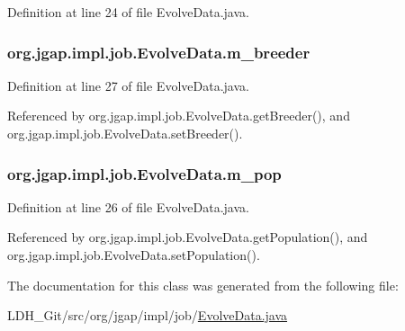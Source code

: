 Definition at line 24 of file Evolve\-Data.\-java.

\hypertarget{classorg_1_1jgap_1_1impl_1_1job_1_1_evolve_data_ac8aa8a8aae7d28f929d42715f6282bcf}{
\subsubsection[{m\-\_\-breeder}]{ org.\-jgap.\-impl.\-job.\-Evolve\-Data.\-m\-\_\-breeder\hspace{0.3cm}{\ttfamily [private]}}}\label{classorg_1_1jgap_1_1impl_1_1job_1_1_evolve_data_ac8aa8a8aae7d28f929d42715f6282bcf}


Definition at line 27 of file Evolve\-Data.\-java.



Referenced by org.\-jgap.\-impl.\-job.\-Evolve\-Data.\-get\-Breeder(), and org.\-jgap.\-impl.\-job.\-Evolve\-Data.\-set\-Breeder().

\hypertarget{classorg_1_1jgap_1_1impl_1_1job_1_1_evolve_data_a99e01adda240e2093606485be749c4f2}{
\subsubsection[{m\-\_\-pop}]{ org.\-jgap.\-impl.\-job.\-Evolve\-Data.\-m\-\_\-pop\hspace{0.3cm}{\ttfamily [private]}}}\label{classorg_1_1jgap_1_1impl_1_1job_1_1_evolve_data_a99e01adda240e2093606485be749c4f2}


Definition at line 26 of file Evolve\-Data.\-java.



Referenced by org.\-jgap.\-impl.\-job.\-Evolve\-Data.\-get\-Population(), and org.\-jgap.\-impl.\-job.\-Evolve\-Data.\-set\-Population().



The documentation for this class was generated from the following file\-:\begin{DoxyCompactItemize}
\item 
L\-D\-H\-\_\-\-Git/src/org/jgap/impl/job/\hyperlink{_evolve_data_8java}{Evolve\-Data.\-java}\end{DoxyCompactItemize}
